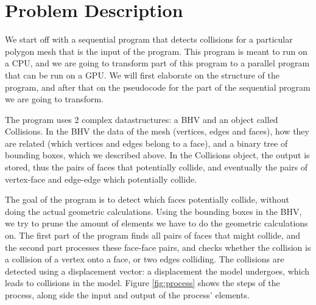 \section{Problem Description}
We start off with a sequential program that detects collisions for a particular polygon mesh that is the input of the program. This program is meant to run on a CPU, and we are going to transform part of this program to a parallel program that can be run on a GPU. We will first elaborate on the structure of the program, and after that on the pseudocode for the part of the sequential program we are going to transform.

The program uses 2 complex datastructures: a BHV and an object called Collisions. In the BHV the data of the mesh (vertices, edges and faces), how they are related (which vertices and edges belong to a face), and a binary tree of bounding boxes, which we described above. In the Collisions object, the output is stored, thus the pairs of faces that potentially collide, and eventually the pairs of vertex-face and edge-edge which potentially collide.

The goal of the program is to detect which faces potentially collide, without doing the actual geometric calculations. Using the bounding boxes in the BHV, we try to prune the amount of elements we have to do the geometric calculations on. The first part of the program finds all pairs of faces that might collide, and the second part processes these face-face pairs, and checks whether the collision is a collision of a vertex onto a face, or two edges colliding. The collisions are detected using a displacement vector: a displacement the model undergoes, which leads to collisions in the model. Figure \ref{fig:process} shows the steps of the process, along side the input and output of the process' elements.


